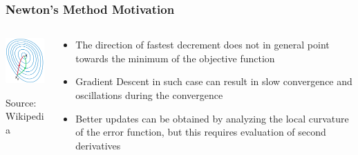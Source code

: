 \documentclass{beamer}
\begin{document}
\begin{frame}

	\frametitle{Newton's Method Motivation}

	\begin{columns}
	
	\begin{column}{.3\textwidth}
		\vspace{.2cm}
		\centerline{\includegraphics[width=3cm]{./figs/Newton_vs_Gradient.png}}
		
		Source: Wikipedia
	\end{column}
	
	\begin{column}{.7\textwidth}

		\begin{itemize}
		\item The direction of fastest decrement does not in general point towards the minimum of the objective function
		
		\item Gradient Descent in such case can result in slow convergence and oscillations during the convergence
		
		\item Better updates can be obtained by analyzing the local curvature of the error function, but this requires evaluation of second derivatives

		\end{itemize}

	\end{column}
	
	\end{columns}

\end{frame}
\end{document}
